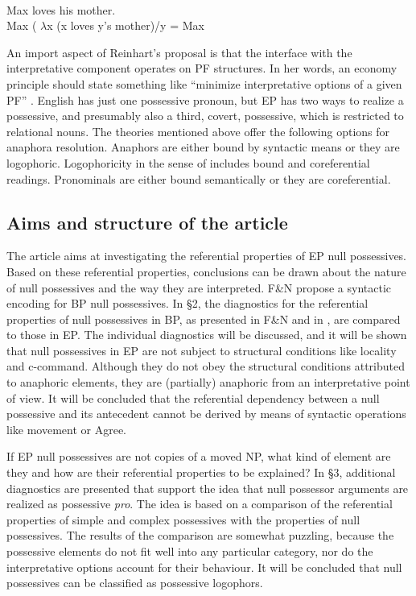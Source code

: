 \documentclass[output=paper]{langsci/langscibook}
\begin{document}
\ea%
    \citep[186]{Reinhart2006}\\\label{ex:wein:13}
    Max loves his mother.\\
    Max ( $\lambda $x (x loves y’s mother)\slash y = Max\\
\z

An import aspect of Reinhart’s proposal is that the interface with the interpretative component operates on PF structures. In her words, an economy principle should state something like “minimize interpretative options of a given PF” \citep[103]{Reinhart2006}. English has just one possessive pronoun, but EP has two ways to realize a possessive, and presumably also a third, covert, possessive, which is restricted to relational nouns. The theories mentioned above offer the following options for anaphora resolution. Anaphors are either bound by syntactic means or they are logophoric. Logophoricity in the sense of \citet{Reuland2011} includes bound and coreferential readings. Pronominals are either bound semantically or they are coreferential.

\subsection{Aims and structure of the article}%

The article aims at investigating the referential properties of EP null possessives. Based on these referential properties, conclusions can be drawn about the nature of null possessives and the way they are interpreted. F\&N propose a syntactic encoding for BP null possessives. In §2, the diagnostics for the referential properties of null possessives in BP, as presented in F\&N and in \citet{Rodrigues2010}, are compared to those in EP. The individual diagnostics will be discussed, and it will be shown that null possessives in EP are not subject to structural conditions like locality and c-command. Although they do not obey the structural conditions attributed to anaphoric elements, they are (partially) anaphoric from an interpretative point of view. It will be concluded that the referential dependency between a null possessive and its antecedent cannot be derived by means of syntactic operations like movement or Agree.

If EP null possessives are not copies of a moved NP, what kind of element are they and how are their referential properties to be explained? In §3, additional diagnostics are presented that support the idea that null possessor arguments are realized as possessive \textit{pro}. The idea is based on a comparison of the referential properties of simple and complex possessives with the properties of null possessives. The results of the comparison are somewhat puzzling, because the possessive elements do not fit well into any particular category, nor do the interpretative options account for their behaviour. It will be concluded that null possessives can be classified as possessive logophors.
\end{document}
